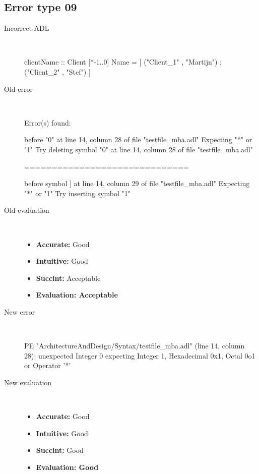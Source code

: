 \hrulefill

\subsection{Error type 09}
  \begin{description}
  \item[Incorrect ADL]~\\
\begin{adl}
clientName :: Client [*-1..0] Name =
    [ ("Client_1"      , "Martijn")
    ; ("Client_2"      , "Stef")
    ]\end{adl}
  \item[Old error]~\\
\begin{haskell}
Error(s) found:

before "0" at line 14, column 28 of file "testfile_mba.adl"
Expecting "*" or "1"
Try deleting symbol "0" at line 14, column 28 of file "testfile_mba.adl"

==============================

before symbol ] at line 14, column 29 of file "testfile_mba.adl"
Expecting "*" or "1"
Try inserting symbol "1"\end{haskell}
  \item[Old evaluation]~\\
    \begin{itemize}
    \item \textbf{Accurate:} Good
    \item \textbf{Intuitive:} Good
    \item \textbf{Succint:} Acceptable
    \item \textbf{Evaluation: Acceptable}
    \end{itemize}
  \item[New error]~\\
\begin{haskell}
PE "ArchitectureAndDesign/Syntax/testfile_mba.adl" (line 14, column 28):
unexpected Integer 0
expecting Integer 1, Hexadecimal 0x1, Octal 0o1 or Operator '*'\end{haskell}
  \item[New evaluation]~\\
    \begin{itemize}
    \item \textbf{Accurate:} Good
    \item \textbf{Intuitive:} Good
    \item \textbf{Succint:} Good
    \item \textbf{Evaluation: Good
}
    \end{itemize}
  \end{description}

